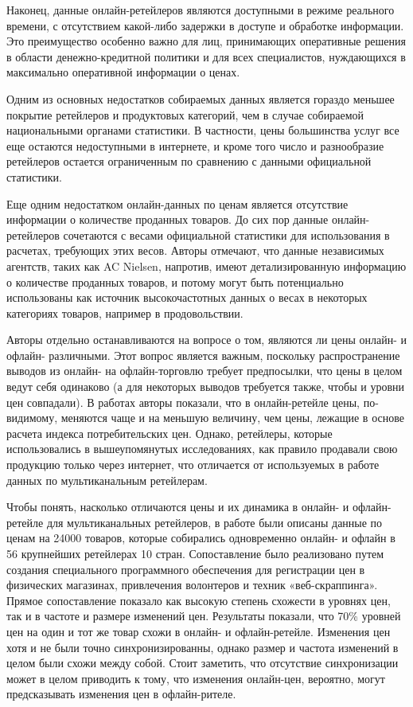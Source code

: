 Наконец, данные онлайн-ретейлеров являются доступными в режиме реального времени, с отсутствием какой-либо задержки в доступе и обработке информации. Это преимущество особенно важно для лиц, принимающих оперативные решения в области денежно-кредитной политики и для всех специалистов, нуждающихся в максимально оперативной информации о ценах.

Одним из основных недостатков собираемых данных является гораздо меньшее покрытие ретейлеров и продуктовых категорий, чем в случае собираемой национальными органами статистики. В частности, цены большинства услуг все еще остаются недоступными в интернете, и кроме того число и разнообразие ретейлеров остается ограниченным по сравнению с данными официальной статистики.

Еще одним недостатком онлайн-данных по ценам является отсутствие информации о количестве проданных товаров. До сих пор данные онлайн-ретейлеров сочетаются с весами официальной статистики для использования в расчетах, требующих этих весов. Авторы отмечают, что данные независимых агентств, таких как AC Nielsen, напротив, имеют детализированную информацию о количестве проданных товаров, и потому могут быть потенциально использованы как источник высокочастотных данных о весах в некоторых категориях товаров, например в продовольствии.

Авторы отдельно останавливаются на вопросе о том, являются ли цены онлайн- и офлайн- различными. Этот вопрос является важным, поскольку распространение выводов из онлайн- на офлайн-торговлю требует предпосылки, что цены в целом ведут себя одинаково (а для некоторых выводов требуется также, чтобы и уровни цен совпадали). В работах \cite{brynjolfsson2000frictionless, ellison2009search, gorodnichenko2018price} авторы показали, что в онлайн-ретейле цены, по-видимому, меняются чаще и на меньшую величину, чем цены, лежащие в основе расчета индекса потребительских цен. Однако, ретейлеры, которые использовались в вышеупомянутых исследованиях, как правило продавали свою продукцию только через интернет, что отличается от используемых в работе данных по мультиканальным ретейлерам.

Чтобы понять, насколько отличаются цены и их динамика в онлайн- и офлайн-ретейле для мультиканальных ретейлеров, в работе \cite{cavallo2016online} были описаны данные по ценам на 24000 товаров, которые собирались одновременно онлайн- и офлайн в 56 крупнейших ретейлерах 10 стран. Сопоставление было реализовано путем создания специального программного обеспечения для регистрации цен в физических магазинах, привлечения волонтеров и техник «веб-скраппинга». Прямое сопоставление показало как высокую степень схожести в уровнях цен, так и в частоте и размере изменений цен. Результаты показали, что 70\% уровней цен на один и тот же товар схожи в онлайн- и офлайн-ретейле. Изменения цен хотя и не были точно синхронизированны, однако размер и частота изменений в целом были схожи между собой. Стоит заметить, что отсутствие синхронизации может в целом приводить к тому, что изменения онлайн-цен, вероятно, могут предсказывать изменения цен в офлайн-рителе.

